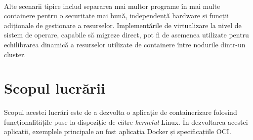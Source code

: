     \paragraph{} Alte scenarii tipice includ separarea mai multor programe în mai multe containere pentru o securitate mai bună, independență hardware și funcții adiționale de gestionare a resurselor. Implementările de virtualizare la nivel de sistem de operare, capabile să migreze direct, pot fi de asemenea utilizate pentru echilibrarea dinamică a resurselor utilizate de containere între nodurile dintr-un cluster. \cite{wiki:osv}


\section{Scopul lucrării}
    \paragraph{} Scopul acestei lucrări este de a dezvolta o aplicație de containerizare folosind funcțio\-nalitățile puse la dispoziție de către \textit{kernelul} Linux. În dezvoltarea acestei aplicații, exemplele principale au fost aplicația Docker și specificațiile OCI.


